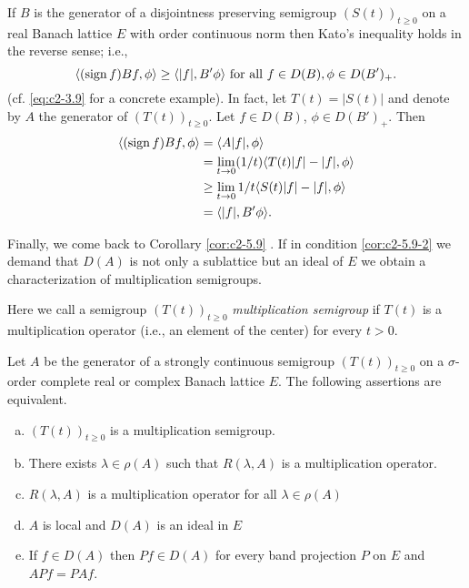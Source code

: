 \begin{remark}\label{rem:c2-5.12}
If $B$ is the generator of a disjointness preserving semigroup $(S(t))_{t \geq 0}$ on a real Banach lattice $E$ with order continuous norm then Kato's inequality holds in the reverse sense; i.e.,
\[
\langle(\operatorname{sign}  f)Bf,\phi \rangle \geq \langle |f|, B'\phi \rangle \text{ for all } f \in D(B), \phi \in D(B')_{+}.
\]
(cf. \eqref{eq:c2-3.9} for a concrete example). 
In fact, let $T(t) = |S(t)|$ and denote by $A$ the generator of $(T(t))_{t \geq 0}$. 
Let $f \in D(B)$, $\phi \in D(B')_{+}$.
Then 
\begin{align*}
\langle(\operatorname{sign}  f)Bf,\phi \rangle &= \langle A|f|,\phi \rangle \\
 &= \lim_{t \to 0} (1/t) \langle T(t)|f| - |f|, \phi \rangle \\
 &\geq \lim_{t \to 0} 1/t \langle S(t)|f| - |f|, \phi \rangle \\
 &= \langle |f|, B'\phi \rangle.
\end{align*}
\end{remark}

Finally, we come back to Corollary \ref{cor:c2-5.9}  .
If in condition \ref{cor:c2-5.9-2}   we demand that $D(A)$ is not only a sublattice but an ideal of $E$ we obtain a characterization of multiplication semigroups.

Here we call a semigroup $(T(t))_{t \geq 0}$ \emph{multiplication semigroup} if $T(t)$ is a multiplication operator (i.e., an element of the center) for every $t > 0$.

\begin{theorem}\label{thm:c2-5.13}
Let $A$ be the generator of a strongly continuous semigroup $(T(t))_{t \geq 0}$ on a $\sigma$-order complete real or complex Banach lattice $E$.
The following assertions are equivalent.
\begin{enumerate}[(a)]
\item \label{thm:c2-5.13-1}
$(T(t))_{t \geq 0}$ is a multiplication semigroup.
\item \label{thm:c2-5.13-2}
There exists $\lambda \in \rho(A)$ such that $R(\lambda,A)$ is a multiplication operator.
\item \label{thm:c2-5.13-3}
$R(\lambda,A)$ is a multiplication operator for all $\lambda \in \rho(A)$
\item \label{thm:c2-5.13-4}
$A$ is local and $D(A)$ is an ideal in $E$
\item \label{thm:c2-5.13-5}
If $f \in D(A)$ then $Pf \in D(A)$ for every band projection $P$ on $E$ and $APf = PAf$.
\end{enumerate}
\end{theorem}

